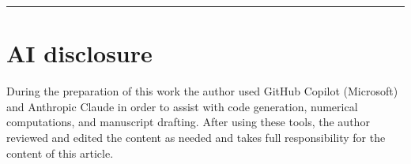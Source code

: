 \documentclass[11pt]{amsart}
\begin{document}
\bigskip
\hrule
\bigskip

\section*{AI disclosure}

\noindent
During the preparation of this work the author used GitHub Copilot
(Microsoft) and Anthropic Claude in order to assist with code
generation, numerical computations, and manuscript drafting.  After
using these tools, the author reviewed and edited the content as
needed and takes full responsibility for the content of this article.
\end{document}
